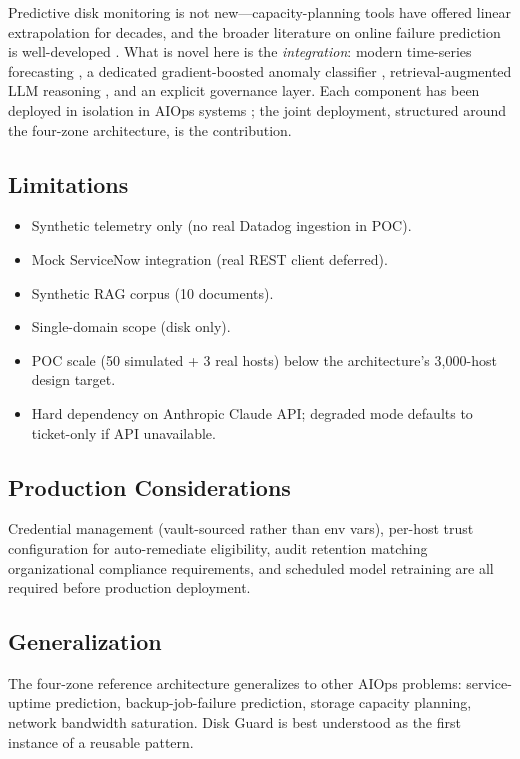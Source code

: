 \documentclass[conference]{IEEEtran}
\begin{document}
Predictive disk monitoring is not new---capacity-planning tools have
offered linear extrapolation for decades, and the broader literature
on online failure prediction is well-developed
\cite{salfner2010survey,lin2018predicting}. What is novel here is
the \emph{integration}: modern time-series forecasting
\cite{taylor2018forecasting}, a dedicated gradient-boosted anomaly
classifier \cite{chen2016xgboost}, retrieval-augmented LLM reasoning
\cite{lewis2020rag,brown2020gpt3}, and an explicit governance layer.
Each component has been deployed in isolation in AIOps systems
\cite{notaro2021aiops}; the joint deployment, structured around the
four-zone architecture, is the contribution.

\subsection{Limitations}

\begin{itemize}
\item Synthetic telemetry only (no real Datadog ingestion in POC).
\item Mock ServiceNow integration (real REST client deferred).
\item Synthetic RAG corpus (10 documents).
\item Single-domain scope (disk only).
\item POC scale (50 simulated + 3 real hosts) below the architecture's
  3{,}000-host design target.
\item Hard dependency on Anthropic Claude API; degraded mode
  defaults to ticket-only if API unavailable.
\end{itemize}

\subsection{Production Considerations}

Credential management (vault-sourced rather than env vars), per-host
trust configuration for auto-remediate eligibility, audit retention
matching organizational compliance requirements, and scheduled model
retraining are all required before production deployment.

\subsection{Generalization}

The four-zone reference architecture generalizes to other AIOps
problems: service-uptime prediction, backup-job-failure prediction,
storage capacity planning, network bandwidth saturation. Disk Guard
is best understood as the first instance of a reusable pattern.
\end{document}
